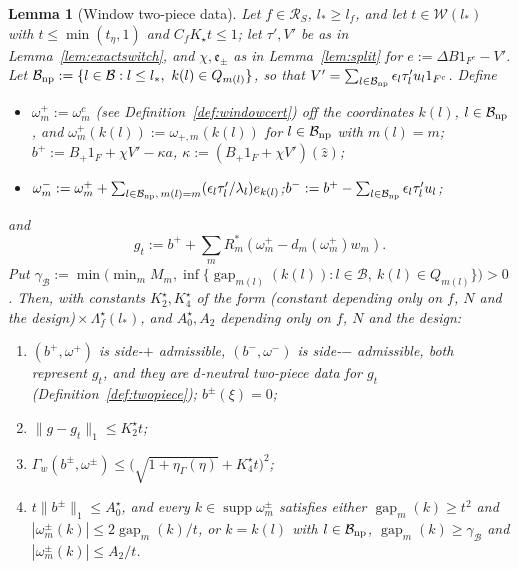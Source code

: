 \documentclass[10pt]{amsart}
\newtheorem{lemma}[theorem]{Lemma}
\theoremstyle{definition}
\theoremstyle{remark}
\newcommand{\supp}{\operatorname{supp}}
\newcommand{\gap}{\operatorname{gap}}
\newcommand{\zh}{\hat z}
\begin{document}
\begin{lemma}[Window two-piece data]\label{lem:windowtwopiece}
Let $f\in\mathcal R_S$, $l_*\ge l_f$, and let $t\in\mathcal W(l_*)$ with
$t\le\min(t_\eta,1)$ and $C_fK_\star t\le1$; let $\tau',V'$ be as in
Lemma~\ref{lem:exactswitch}, and $\chi,\mathfrak e_\pm$ as in
Lemma~\ref{lem:split} for $e:=\Delta B1_{F^c}-V'$.  Let $\mathcal B_{\rm np}
:=\{l\in\mathcal B:l\le l_*,\ k(l)\in Q_{m(l)}\}$, so that $V'=\sum_{l\in
\mathcal B_{\rm np}}\epsilon_l\tau'_lu_l1_{F^c}$.  Define
\begin{itemize}
\item[$+$:] $\omega^+_m:=\omega^c_m$ (see Definition~\ref{def:windowcert})
off the coordinates $k(l)$, $l\in\mathcal B_{\rm np}$, and
$\omega^+_m(k(l)):=\omega_{+,m}(k(l))$ for $l\in\mathcal B_{\rm np}$ with
$m(l)=m$;\quad $b^+:=B_+1_F+\chi V'-\kappa a$, $\kappa:=(B_+1_F+\chi V')(\zh)$;
\item[$-$:] $\omega^-_m:=\omega^+_m+\sum_{l\in\mathcal B_{\rm np},\,m(l)=m}
(\epsilon_l\tau'_l/\lambda_l)e_{k(l)}$;\quad $b^-:=b^+-\sum_{l\in\mathcal
B_{\rm np}}\epsilon_l\tau'_lu_l$;
\end{itemize}
and
\[
 g_t:=b^++\sum_mR_m^*(\omega^+_m-d_m(\omega^+_m)w_m).
\]
Put
$\gamma_{\mathcal B}:=\min\big(\min_mM_m,\inf\{\gap_{m(l)}(k(l)):l\in
\mathcal B,\ k(l)\in Q_{m(l)}\}\big)>0$.  Then, with constants $K^\star_2,
K^\star_4$ of the form \textup{(}constant depending only on $f$, $N$ and the
design\textup{)}${}\times\Lambda^\star_f(l_*)$, and $A^\star_0,A_2$
depending only on $f$, $N$ and the design:
\begin{enumerate}
\item[(a)] $(b^+,\omega^+)$ is side-$+$ admissible, $(b^-,\omega^-)$ is
side-$-$ admissible, both represent $g_t$, and they are $d$-neutral
two-piece data for $g_t$ \textup{(}Definition~\ref{def:twopiece}\textup{)};
$b^\pm(\xi)=0$;
\item[(b)] $\|g-g_t\|_1\le K^\star_2t$;
\item[(c)] $\Gamma_w(b^\pm,\omega^\pm)\le\big(\sqrt{1+\eta_\Gamma(\eta)}+
K^\star_4t\big)^2$;
\item[(d)] $t\|b^\pm\|_1\le A^\star_0$, and every $k\in\supp\omega^\pm_m$
satisfies either $\gap_m(k)\ge t^2$ and $|\omega^\pm_m(k)|\le2\gap_m(k)/t$,
or $k=k(l)$ with $l\in\mathcal B_{\rm np}$, $\gap_m(k)\ge\gamma_{\mathcal B}$
and $|\omega^\pm_m(k)|\le A_2/t$.
\end{enumerate}
\end{lemma}
\end{document}
